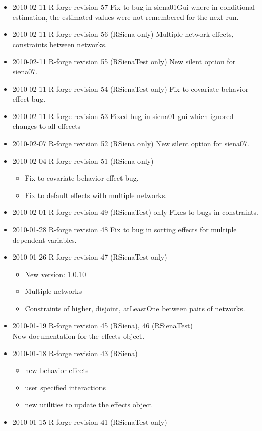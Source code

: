 \documentclass[a4paper,fleqn]{article}
\newcommand{\+}{\, + \,}
\begin{document}
{\begin{itemize}
  package.) Added a skeleton MCMC routine.
\item 2010-02-11 R-forge revision 57 Fix to bug in siena01Gui where in
  conditional estimation, the
  estimated values were not remembered for the next run.
\item 2010-02-11 R-forge revision 56 (RSiena only)
Multiple network effects, constraints between networks.
\item 2010-02-11 R-forge revision 55 (RSienaTest only)
New silent option for siena07.
\item 2010-02-11 R-forge revision 54 (RSienaTest only)
Fix to covariate behavior effect bug.
\item 2010-02-11 R-forge revision 53
Fixed bug in siena01 gui which ignored changes to all effeccts
\item 2010-02-07 R-forge revision 52 (RSiena only)
New silent option for siena07.
\item 2010-02-04 R-forge revision 51 (RSiena only)
\begin{itemize}
\item
Fix to covariate behavior effect bug.
\item
Fix to default effects with multiple networks.
\end{itemize}
\item 2010-02-01 R-forge revision 49 (RSienaTest) only
Fixes to bugs in constraints.
\item 2010-01-28 R-forge revision 48
Fix to bug in sorting effects for multiple dependent variables.
\item 2010-01-26 R-forge revision 47 (RSienaTest only)
\begin{itemize}
\item New version: 1.0.10
\item Multiple networks
\item Constraints of higher, disjoint, atLeastOne between pairs of networks.
\end{itemize}
\item 2010-01-19 R-forge revision 45 (RSiena), 46 (RSienaTest)\\
 New documentation for the effects object.
\item 2010-01-18 R-forge revision 43 (RSiena)
\begin{itemize}
\item new behavior effects
\item user specified interactions
\item new utilities to update the effects object
\end{itemize}
\item 2010-01-15 R-forge revision 41 (RSienaTest only)


\end{itemize}}
\end{document}
